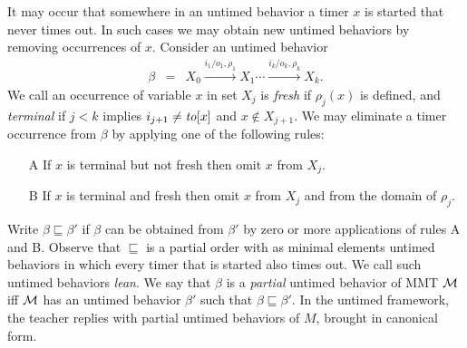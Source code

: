 It may occur that somewhere in an untimed behavior a timer $x$ is started that never times out.
In such cases we may obtain new untimed behaviors by removing occurrences of $x$.
Consider an untimed behavior
\begin{eqnarray*}
\beta & = & X_0 \xrightarrow{i_1/o_1, \rho_1} X_1  \cdots \xrightarrow{i_k/o_k, \rho_k} X_{k}.
\end{eqnarray*}
We call an occurrence of variable $x$ in set $X_j$ is \emph{fresh} if $\rho_j(x)$ is defined,
and \emph{terminal} if $j<k$ implies $i_{j+1} \neq \mathit{to}[x]$ and $x \not\in X_{j+1}$.
We may eliminate a timer occurrence from $\beta$ by applying one of the following rules:
\begin{itemize}
\item[A]
If $x$ is terminal but not fresh then omit $x$ from $X_j$.
\item[B]
If $x$ is terminal and fresh then omit $x$ from $X_j$ and from the domain of $\rho_j$.
\end{itemize}
Write $\beta \sqsubseteq \beta'$ if $\beta$ can be obtained from $\beta'$ by zero or more applications of rules A and B.
Observe that $\sqsubseteq$ is a partial order with as minimal elements untimed behaviors in which every timer that is started also times out.
We call such untimed behaviors \emph{lean}.
We say that $\beta$ is a \emph{partial} untimed behavior of MMT ${\mathcal M}$ iff ${\mathcal M}$ has an untimed behavior $\beta'$ such that $\beta \sqsubseteq \beta'$.
In the untimed framework, the teacher replies with partial untimed behaviors of $M$, brought in canonical form.

